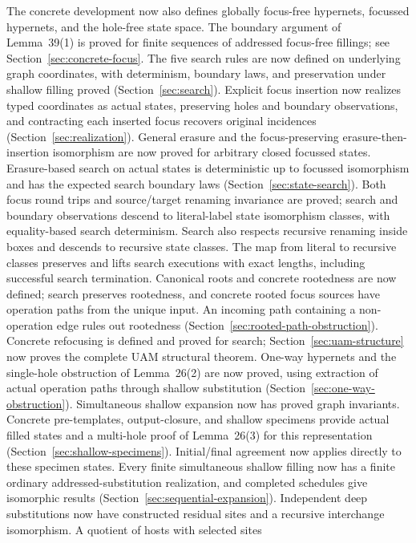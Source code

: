 The concrete development now also defines globally focus-free hypernets,
focussed hypernets, and the hole-free state space. The boundary argument of
Lemma~39(1) is proved for finite sequences of addressed focus-free fillings;
see Section~\ref{sec:concrete-focus}. The five search rules are now defined on underlying graph coordinates, with
determinism, boundary laws, and preservation under shallow filling proved
(Section~\ref{sec:search}). Explicit focus insertion now realizes typed
coordinates as actual states, preserving holes and boundary observations, and
contracting each inserted focus recovers original incidences
(Section~\ref{sec:realization}). General erasure and the focus-preserving erasure-then-insertion isomorphism are
now proved for arbitrary closed focussed states. Erasure-based search on actual
states is deterministic up to focussed isomorphism and has the expected search
boundary laws (Section~\ref{sec:state-search}). Both focus round trips and
source/target renaming invariance are proved; search and boundary observations
descend to literal-label state isomorphism classes, with equality-based search
determinism. Search also respects recursive renaming inside boxes and descends
to recursive state classes. The map from literal to recursive classes preserves
and lifts search executions with exact lengths, including successful search
termination. Canonical roots and concrete rootedness are now defined; search
preserves rootedness, and concrete rooted focus sources have operation paths
from the unique input. An incoming path containing a non-operation edge rules
out rootedness (Section~\ref{sec:rooted-path-obstruction}). Concrete refocusing
is defined and proved for search; Section~\ref{sec:uam-structure} now proves
the complete UAM structural theorem. One-way hypernets and the single-hole
obstruction of Lemma~26(2) are now proved, using extraction of actual operation
paths through shallow substitution (Section~\ref{sec:one-way-obstruction}).
Simultaneous shallow expansion now has proved graph invariants. Concrete
pre-templates, output-closure, and shallow specimens provide actual filled
states and a multi-hole proof of Lemma~26(3) for this representation
(Section~\ref{sec:shallow-specimens}). Initial/final agreement now applies
directly to these specimen states. Every finite simultaneous shallow filling
now has a finite ordinary addressed-substitution realization, and completed
schedules give isomorphic results (Section~\ref{sec:sequential-expansion}).
Independent deep substitutions now have constructed residual sites and a
recursive interchange isomorphism. A quotient of hosts with selected sites

